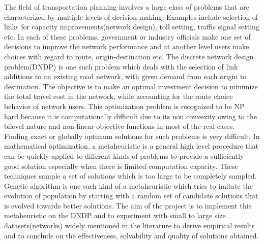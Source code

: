 \documentclass[a4paper, 12pt]{article}
\begin{document}
The field of transportation planning involves a large class of problems that are characterized by multiple levels of decision making. Examples include selection of links for capacity improvements(network design), toll setting, traffic signal setting etc. In each of these problems, government or industry officials make one set of decisions to improve the network performance and at another level users make choices with regard to route, origin-destination etc. The discrete network design problem(DNDP) is one such problem which deals with the selection of link additions to an existing road network, with given demand from each origin to destination. The objective is to make an optimal investment decision to minimize the total travel cost in the network, while accounting for the route choice behavior of network users. This optimization problem is recognized to be NP hard because it is computationally difficult due to its non convexity owing to the bilevel nature and non-linear objective functions in most of the real cases. Finding exact or globally optimum solutions for such problems is very difficult. In mathematical optimization, a metaheuristic is a general high level procedure that can be quickly applied to different kinds of problems to provide a sufficiently good solution especially when there is limited computation capacity. These techniques sample a set of solutions which is too large to be completely sampled. Genetic algorithm is one such kind of a metaheuristic which tries to imitate the evolution of population by starting with a random set of candidate solutions that is evolved towards better solutions. The aim of the project is to implement this metaheuristic on the DNDP and to experiment with small to large size datasets(networks) widely mentioned in the literature to derive empirical results and to conclude on the effectiveness, solvability and quality of solutions obtained.

\newpage
\tableofcontents
\newpage
\end{document}
